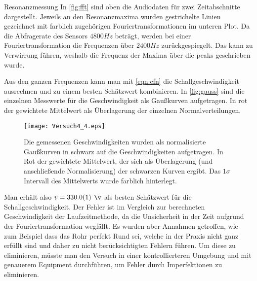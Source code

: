 \documentclass{alex_gp}
\begin{document}
\begin{mybox}{Resonanzmessung}
	In \autoref{fig:fft} sind oben die Audiodaten für zwei Zeitabschnitte dargestellt. Jeweils an den Resonanzmaxima wurden gestrichelte Linien gezeichnet mit farblich zugehörigen Fouriertransformationen im unteren Plot. Da die Abfragerate des Sensors \( 4800 \unit{Hz} \) beträgt, werden bei einer Fouriertransformation die Frequenzen über \( 2400 \unit{Hz} \) zurückgespiegelt. Das kann zu Verwirrung führen, weshalb die Frequenz der Maxima über die peaks geschrieben wurde.
	
	Aus den ganzen Frequenzen kann man mit \autoref{eqn:cfn} die Schallgeschwindigkeit ausrechnen und zu einem besten Schätzwert kombinieren. In \autoref{fig:gauss} sind die einzelnen Messwerte für die Geschwindigkeit als Gaußkurven aufgetragen. In rot der gewichtete Mittelwert als Überlagerung der einzelnen Normalverteilungen. 
	
	\begin{figure}[H]	
		\centering
		\texttt{[image: Versuch4\_4.eps]}
		\caption{Die gemessenen Geschwindigkeiten wurden als normalisierte Gaußkurven in schwarz auf die Geschwindigkeiten aufgetragen. In Rot der gewichtete Mittelwert, der sich als Überlagerung (und anschließende Normalisierung) der schwarzen Kurven ergibt. Das \( 1\sigma \) Intervall des Mittelwerts wurde farblich hinterlegt.}
		\label{fig:gauss}
	\end{figure}

	Man erhält also \( v = 330.0(1) \unit{\v} \) als besten Schätzwert für die Schallgeschwindigkeit. Der Fehler ist im Vergleich zur berechneten Geschwindigkeit der Laufzeitmethode, da die Unsicherheit in der Zeit aufgrund der Fouriertransformation wegfällt. Es wurden aber Annahmen getroffen, wie zum Beispiel dass das Rohr perfekt Rund sei, welche in der Praxis nicht ganz erfüllt sind und daher zu nicht berücksichtigten Fehlern führen. Um diese zu eliminieren, müsste man den Versuch in einer kontrollierteren Umgebung und mit genauerem Equipment durchführen, um Fehler durch Imperfektionen zu eliminieren.
\end{mybox}
\newpage
\end{document}
